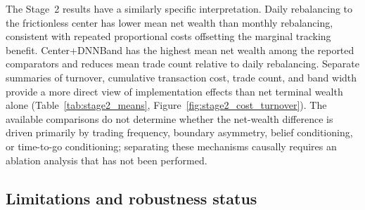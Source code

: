 \documentclass[a4paper,10pt]{article}
\begin{document}
The Stage~2 results have a similarly specific interpretation. Daily rebalancing to the frictionless center has lower mean net wealth than monthly rebalancing, consistent with repeated proportional costs offsetting the marginal tracking benefit. Center+DNNBand has the highest mean net wealth among the reported comparators and reduces mean trade count relative to daily rebalancing. Separate summaries of turnover, cumulative transaction cost, trade count,
and band width provide a more direct view of implementation effects than
net terminal wealth alone (Table~\ref{tab:stage2_means}, Figure~\ref{fig:stage2_cost_turnover}). The available comparisons do not determine whether the net-wealth difference is driven primarily by trading frequency, boundary asymmetry, belief conditioning, or time-to-go conditioning; separating these mechanisms causally requires an ablation analysis that has not been performed.

\subsection{Limitations and robustness status}
\end{document}
